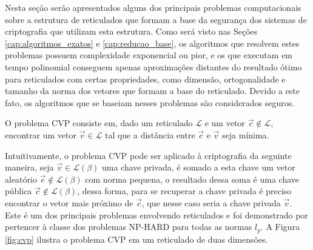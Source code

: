 


    
    Nesta seção serão apresentados alguns dos principais problemas computacionais sobre a estrutura de reticulados que formam a base da segurança dos sistemas de criptografia que utilizam esta estrutura. Como será visto nas Seções \ref{cap:algoritmos_exatos} e \ref{cap:reducao_base}, os algoritmos que resolvem estes problemas possuem complexidade exponencial ou pior, e os que executam em tempo polinomial conseguem apenas aproximações distantes do resultado ótimo para reticulados com certas propriedades, como dimensão, ortogonalidade e tamanho da norma dos vetores que formam a base do reticulado. Devido a este fato, os algoritmos que se baseiam nesses problemas são considerados seguros. 

    
    \begin{definition}
        O problema \ac{CVP} consiste em, dado um reticulado $\mathcal{L}$ e um vetor $\vec{c} \notin \mathcal{L}$, encontrar um vetor $\vec{v} \in \mathcal{L}$ tal que a distância entre $\vec{c}$ e $\vec{v}$ seja mínima.
    \end{definition}

    Intuitivamente, o problema \ac{CVP} pode ser aplicado à criptografia da seguinte maneira, seja $\vec{v} \in \mathcal{L(\beta)}$ uma chave privada, é somado a esta chave um vetor aleatório $\vec{e} \notin \mathcal{L(\beta)}$ com norma pequena, o resultado dessa soma é uma chave pública $\vec{c} \notin \mathcal{L(\beta)}$, dessa forma, para se recuperar a chave privada é preciso encontrar o vetor mais próximo de $\vec{c}$, que nesse caso seria a chave privada $\vec{v}$. Este é um dos principais problemas envolvendo reticulados e foi demonstrado por \cite{np-hard-cvp-svp} pertencer à classe dos problemas \ac{NP-HARD} para todas as normas $l_p$. A Figura \ref{fig:cvp} ilustra o problema \ac{CVP} em um reticulado de duas dimensões.
    
